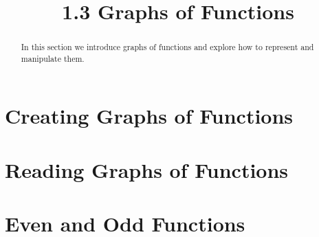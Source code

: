 \documentclass[handout]{ximera}
\title{1.3 Graphs of Functions}
\begin{document}
\begin{abstract}
In this section we introduce graphs of functions and explore how to represent and manipulate them.
\end{abstract}

\maketitle

\section{Creating Graphs of Functions}

\section{Reading Graphs of Functions}

\section{Even and Odd Functions}
\end{document}
